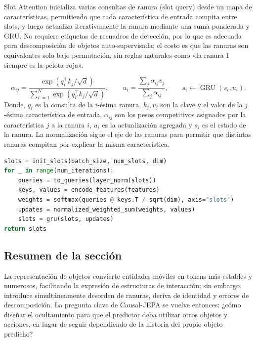 Slot Attention inicializa varias consultas de ranura (slot query) desde un mapa de características, permitiendo que cada característica de entrada compita entre slots, y luego actualiza iterativamente la ranura mediante una suma ponderada y GRU. No requiere etiquetas de recuadros de detección, por lo que es adecuada para descomposición de objetos auto-supervisada; el costo es que las ranuras son equivalentes solo bajo permutación, sin reglas naturales como «la ranura 1 siempre es la pelota roja».



\[
\alpha_{ij}=\frac{\exp(q_i^\top k_j/\sqrt d)}{\sum_{i'=1}^{N}\exp(q_{i'}^\top k_j/\sqrt d)},
\qquad
u_i=\frac{\sum_j \alpha_{ij}v_j}{\sum_j\alpha_{ij}},
\qquad
s_i\leftarrow\operatorname{GRU}(s_i,u_i).
\]
Donde, $q_i$ es la consulta de la $i$-ésima ranura, $k_j,v_j$ son la clave y el valor de la $j$-ésima característica de entrada, $\alpha_{ij}$ son los pesos competitivos asignados por la característica $j$ a la ranura $i$, $u_i$ es la actualización agregada y $s_i$ es el estado de la ranura. La normalización sigue el eje de las ranuras para permitir que distintas ranuras compitan por explicar la misma característica.

\begin{lstlisting}[language=Python,caption={Pseudocódigo del mecanismo mínimo de Slot Attention}]
slots = init_slots(batch_size, num_slots, dim)
for _ in range(num_iterations):
    queries = to_queries(layer_norm(slots))
    keys, values = encode_features(features)
    weights = softmax(queries @ keys.T / sqrt(dim), axis="slots")
    updates = normalized_weighted_sum(weights, values)
    slots = gru(slots, updates)
return slots
\end{lstlisting}


\subsection{Resumen de la sección}

La representación de objetos convierte entidades móviles en tokens más estables y numerosos, facilitando la expresión de estructuras de interacción; sin embargo, introduce simultáneamente desorden de ranuras, deriva de identidad y errores de descomposición. La pregunta clave de Causal-JEPA se vuelve entonces: ¿cómo diseñar el ocultamiento para que el predictor deba utilizar otros objetos y acciones, en lugar de seguir dependiendo de la historia del propio objeto predicho?


